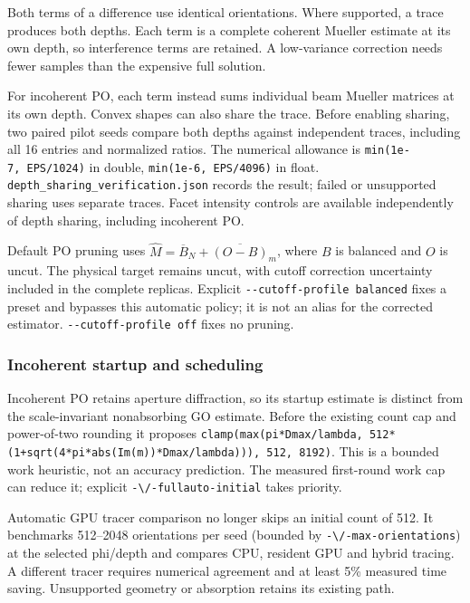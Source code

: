 Both terms of a difference use identical orientations. Where supported,
a trace produces both depths. Each term is a complete coherent Mueller
estimate at its own depth, so interference terms are retained. A
low-variance correction needs fewer samples than the expensive full
solution.

For incoherent PO, each term instead sums individual beam Mueller
matrices at its own depth. Convex shapes can also share the trace.
Before enabling sharing, two paired pilot seeds compare both depths
against independent traces, including all 16 entries and normalized
ratios. The numerical allowance is \texttt{min(1e-7,\ EPS/1024)} in
double, \texttt{min(1e-6,\ EPS/4096)} in float.
\nolinkurl{depth_sharing_verification.json} records the result; failed or
unsupported sharing uses separate traces. Facet intensity controls are
available independently of depth sharing, including incoherent PO.

Default PO pruning uses \(\widehat M=\overline B_N+\overline{(O-B)}_m\),
where \(B\) is balanced and \(O\) is uncut. The physical target remains
uncut, with cutoff correction uncertainty included in the complete
replicas. Explicit \texttt{-\/-cutoff-profile\ balanced} fixes a preset
and bypasses this automatic policy; it is not an alias for the corrected
estimator. \texttt{-\/-cutoff-profile\ off} fixes no pruning.

\subsubsection{Incoherent startup and
scheduling}\label{incoherent-startup-and-scheduling}

Incoherent PO retains aperture diffraction, so its startup estimate is
distinct from the scale-invariant nonabsorbing GO estimate. Before the
existing count cap and power-of-two rounding it proposes
\texttt{clamp(max(pi*Dmax/lambda,\ 512*(1+sqrt(4*pi*abs(Im(m))*Dmax/lambda))),\ 512,\ 8192)}.
This is a bounded work heuristic, not an accuracy prediction. The
measured first-round work cap can reduce it; explicit
\nolinkurl{-\/-fullauto-initial} takes priority.

Automatic GPU tracer comparison no longer skips an initial count of 512.
It benchmarks 512--2048 orientations per seed (bounded by
\nolinkurl{-\/-max-orientations}) at the selected phi/depth and compares
CPU, resident GPU and hybrid tracing. A different tracer requires
numerical agreement and at least 5\% measured time saving. Unsupported
geometry or absorption retains its existing path.


